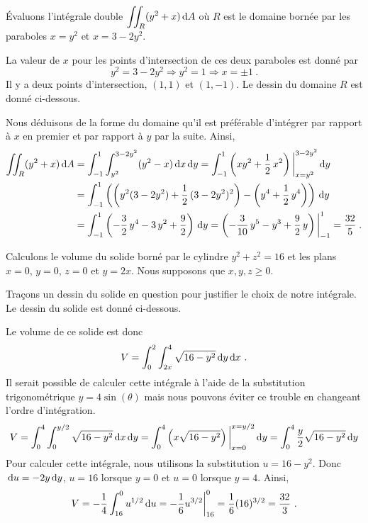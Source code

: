 {\begin{egg}
Évaluons l'intégrale double $\displaystyle \iint_R (y^2+ x) \,\mathrm{d}A$ où
$R$ est le domaine bornée par les paraboles $x=y^2$ et $x=3-2y^2$.

La valeur de $x$ pour les points d'intersection de ces deux paraboles
est donné par
\[
  y^2 = 3-2y^2 \Rightarrow y^2 = 1 \Rightarrow x= \pm 1 \ .
\]
Il y a deux points d'intersection, $(1,1)$ et $(1,-1)$.  Le dessin du
domaine $R$ est donné ci-dessous.

Nous déduisons de la forme du domaine qu'il est préférable d'intégrer par
rapport à $x$ en premier et par rapport à $y$ par la suite.  Ainsi,
\begin{align*}
\iint_R (y^2+x) \,\mathrm{d}A &= \int_{-1}^1 \int_{y^2}^{3-2y^2} (y^2-x) \,\mathrm{d}x\,\mathrm{d}y
= \int_{-1}^1 \left( xy^2 + \frac{1}{2}\, x^2 \right)
\bigg|_{x=y^2}^{3-2y^2} \,\mathrm{d}y \\
&= \int_{-1}^1 \left( \left(y^2(3-2y^2) +\frac{1}{2}\,(3-2y^2)^2\right)
-\left( y^4  + \frac{1}{2}\, y^4\right) \right)\,\mathrm{d}y \\
&= \int_{-1}^1 \left( -\frac{3}{2}\,y^4 -3\, y^2 +\frac{9}{2} \right) \,\mathrm{d}y
= \left( -\frac{3}{10}\, y^5 - y^3 +\frac{9}{2}\,y\right)\bigg|_{-1}^1
= \frac{32}{5} \; .
\end{align*}
\end{egg}

\begin{egg}
Calculons le volume du solide borné par le cylindre $y^2+z^2 = 16$
et les plans $x=0$, $y=0$, $z=0$ et $y = 2x$.  Nous supposons que
$x,y,z \geq 0$.

Traçons un dessin du solide en question pour justifier le choix de
notre intégrale.  Le dessin du solide est donné ci-dessous.

Le volume de ce solide est donc
\[
V = \int_0^2 \int_{2x}^4 \sqrt{16-y^2} \,\mathrm{d}y\,\mathrm{d}x \ .
\]
Il serait possible de calculer cette intégrale à l'aide de la
substitution trigonométrique $y = 4\sin(\theta)$ mais nous pouvons éviter
ce trouble en changeant l'ordre d'intégration.
\[
V = \int_0^4 \int_0^{y/2} \sqrt{16-y^2} \,\mathrm{d}x\,\mathrm{d}y
= \int_0^4 \left( x \sqrt{16-y^2}\right)\bigg|_{x=0}^{x=y/2} \,\mathrm{d}y
= \int_0^4 \frac{y}{2} \sqrt{16-y^2} \,\mathrm{d}y
\]
Pour calculer cette intégrale, nous utilisons la substitution
$u= 16 - y^2$.  Donc $\,\mathrm{d}u = -2 y \,\mathrm{d}y$, $u=16$ lorsque $y=0$ et $u=0$
lorsque $y=4$.  Ainsi,
\[
V = -\frac{1}{4} \int_{16}^0 u^{1/2} \,\mathrm{d}u 
= -\frac{1}{6} u^{3/2}\bigg|_{16}^0
= \frac{1}{6} (16)^{3/2} = \frac{32}{3} \ .
\]
\end{egg}

}
